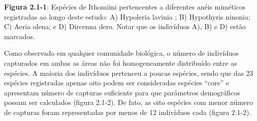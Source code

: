\textbf{Figura 2.1-1}: Espécies de Ithomiini pertencentes a diferentes anéis miméticos registradas ao longo deste estudo: A) Hypoleria lavinia ; B) Hypothyris ninonia; C) Aeria olena; e D) Dircenna dero. Notar que os indivíduos A), B) e D) estão marcados.

Como observado em qualquer comunidade biológica, o número de indivíduos capturados em ambas as áreas não foi homogeneamente distribuído entre as espécies. A maioria dos indivíduos pertenceu a poucas espécies, sendo que das 23 espécies registradas apenas oito podem ser consideradas espécies “core” e apresentam número de capturas suficiente para que parâmetros demográficos possam ser calculados (figura 2.1-2). De fato, as oito espécies com menor número de capturas foram representadas por menos de 12 indivíduos cada (figura 2.1-2).